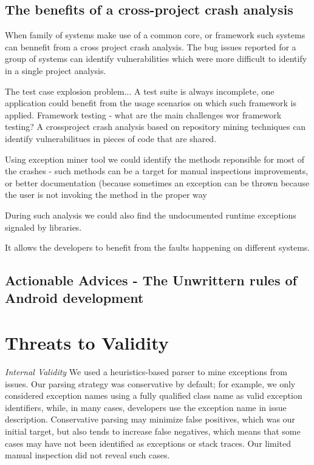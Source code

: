 \documentclass[conference]{IEEEtran}
\begin{document}
\subsection{The benefits of a cross-project crash analysis}  

When family of systems make use of a common core, or framework such systems can
bennefit from a cross project crash analysis. The bug issues reported for a group of systems
can identify vulnerabilities which were more difficult to identify in a single project analysis.

The test case explosion problem... A test suite is always incomplete,
one application could benefit from the usage scenarios on which such framework is applied.
Framework testing -  what are the main challenges wor framework testing?
A crossproject crash analysis based on repository mining techniques can 
identify vulnerabilitues in pieces of code that are shared. 

Using exception miner tool we could identify the methods reponsible for most of the crashes - 
such methods can be a target for manual inspections improvements, or better documentation
(because sometimes an exception can be thrown because the user is not invoking the method
in the proper way 

During such analysis we could also find the undocumented runtime exceptions 
signaled by libraries. 

It allows the developers to benefit from the faults happening on different systems.


\subsection{Actionable Advices - The Unwrittern rules of Android development}




\section{Threats to Validity}

\noindent\emph{Internal Validity} We used a heuristics-based parser to mine
exceptions from issues.  Our parsing strategy was conservative by default; for
example, we only considered exception names using a fully qualified class name
as valid exception identifiers, while, in many cases, developers use the
exception name in issue description. Conservative parsing may minimize false
positives, which was our initial target, but also tends to increase false
negatives, which means that some cases may have not been identified as
exceptions or stack traces. Our limited manual inspection did not reveal such
cases.
\end{document}
